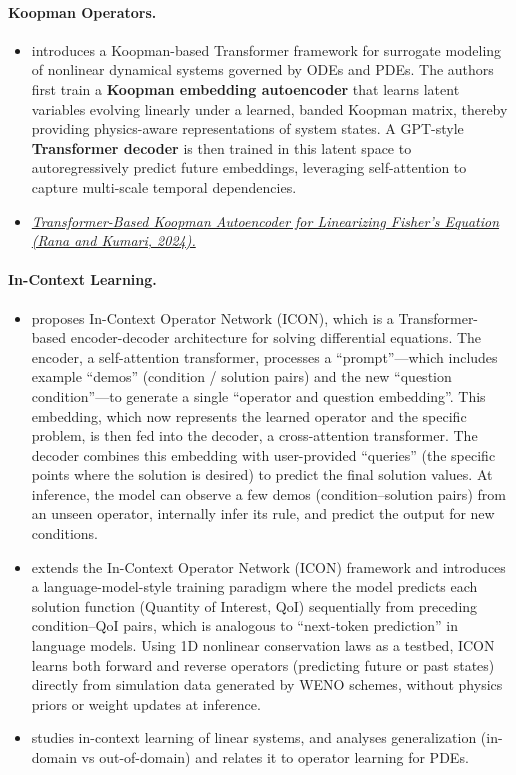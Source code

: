 \documentclass[11pt]{article}
\begin{document}
\paragraph{Koopman Operators.}
\begin{itemize}
\item\cite{geneva2022transformers} introduces a Koopman-based Transformer framework for surrogate modeling of nonlinear dynamical systems governed by ODEs and PDEs. The authors first train a \textbf{Koopman embedding autoencoder} that learns latent variables evolving linearly under a learned, banded Koopman matrix, thereby providing physics-aware representations of system states. A GPT-style \textbf{Transformer decoder} is then trained in this latent space to autoregressively predict future embeddings, leveraging self-attention to capture multi-scale temporal dependencies.

\item\href{https://arxiv.org/pdf/2412.02430}{\it Transformer-Based Koopman Autoencoder for Linearizing Fisher’s Equation (Rana and Kumari, 2024).}
\end{itemize}

\paragraph{In-Context Learning.}
\begin{itemize}
    \item \cite{yang2023context} proposes In-Context Operator Network (ICON), which is a Transformer-based encoder-decoder architecture for solving differential equations. The encoder, a self-attention transformer, processes a ``prompt''—which includes example ``demos'' (condition / solution pairs) and the new ``question condition''—to generate a single ``operator and question embedding''. This embedding, which now represents the learned operator and the specific problem, is then fed into the decoder, a cross-attention transformer. The decoder combines this embedding with user-provided ``queries'' (the specific points where the solution is desired) to predict the final solution values. At inference, the model can observe a few demos (condition–solution pairs) from an unseen operator, internally infer its rule, and predict the output for new conditions.

    \item\cite{yang2024pde} extends the In-Context Operator Network (ICON) framework and introduces a language-model-style training paradigm where the model predicts each solution function (Quantity of Interest, QoI) sequentially from preceding condition–QoI pairs, which is analogous to “next-token prediction” in language models. Using 1D nonlinear conservation laws as a testbed, ICON learns both forward and reverse operators (predicting future or past states) directly from simulation data generated by WENO schemes, without physics priors or weight updates at inference.

    \item\cite{cole2024context} studies in-context learning of linear systems, and analyses generalization (in-domain vs out-of-domain) and relates it to operator learning for PDEs.
\end{itemize}
\end{document}

